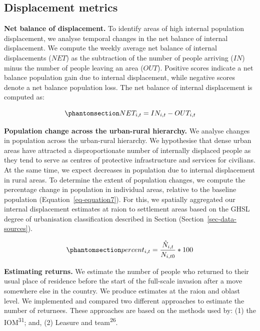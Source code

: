 \documentclass[
  11pt,
]{article}
\begin{document}
\subsection{Displacement metrics}\label{sec-metrics}

\textbf{Net balance of displacement.} To identify areas of high internal
population displacement, we analyse temporal changes in the net balance
of internal displacement. We compute the weekly average net balance of
internal displacements (\(NET\)) as the subtraction of the number of
people arriving (\(IN\)) minus the number of people leaving an area
(\(OUT\)). Positive scores indicate a net balance population gain due to
internal displacement, while negative scores denote a net balance
population loss. The net balance of internal displacement is computed
as:

\begin{equation}\phantomsection\label{eq-equation6}{ NET_{i,t} = {IN_{i,t}} - {OUT_{i,t}} }\end{equation}

\textbf{Population change across the urban-rural hierarchy.} We analyse
changes in population across the urban-rural hierarchy. We hypothesise
that dense urban areas have attracted a disproportionate number of
internally displaced people as they tend to serve as centres of
protective infrastructure and services for civilians. At the same time,
we expect decreases in population due to internal displacement in rural
areas. To determine the extent of population changes, we compute the
percentage change in population in individual areas, relative to the
baseline population (Equation~\ref{eq-equation7}). For this, we
spatially aggregated our internal displacement estimates at raion to
settlement areas based on the GHSL degree of urbanisation classification
described in Section (Section~\ref{sec-data-sources}).

\begin{equation}\phantomsection\label{eq-equation7}{ percent_{i,t} = \frac {\hat{N}_{i,t}} {N_{i,t0}} * 100 }\end{equation}

\textbf{Estimating returns.} We estimate the number of people who
returned to their usual place of residence before the start of the
full-scale invasion after a move somewhere else in the country. We
produce estimates at the raion and oblast level. We implemented and
compared two different approaches to estimate the number of returnees.
These approaches are based on the methods used by: (1) the
IOM\textsuperscript{31}; and, (2) Leasure and team\textsuperscript{26}.
\end{document}
